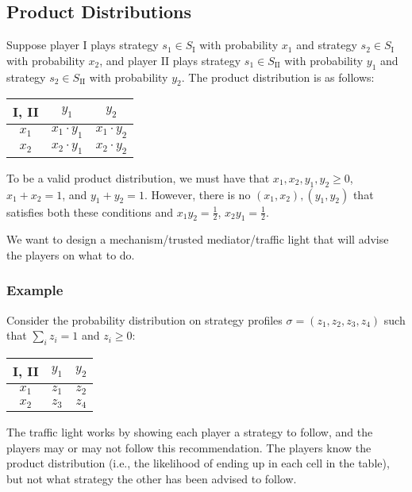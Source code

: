 \subsection{Product Distributions}
	Suppose player I plays strategy $s_1 \in S_\text{I}$ with probability $x_1$
	and strategy $s_2 \in S_\text{I}$ with probability $x_2$, and player II
	plays strategy $s_1 \in S_\text{II}$ with probability $y_1$ and strategy
	$s_2 \in S_\text{II}$ with probability $y_2$. The product distribution is
	as follows:
	\begin{center}
		\begin{tabular}{|c|c|c|}
			\hline
			\textbf{I, II} & $y_1$           & $y_2$ \\ \hline
			$x_1$          & $x_1 \cdot y_1$ & $x_1 \cdot y_2$ \\ \hline
			$x_2$          & $x_2 \cdot y_1$ & $x_2 \cdot y_2$ \\ \hline
		\end{tabular}
	\end{center}

	To be a valid product distribution, we must have that $x_1, x_2, y_1, y_2
	\ge 0$, $x_1 + x_2 = 1$, and $y_1 + y_2 = 1$. However, there is no $(x_1,
	x_2), (y_1, y_2)$ that satisfies both these conditions and $x_1 y_2 =
	\frac{1}{2}$, $x_2 y_1 = \frac{1}{2}$.

	We want to design a mechanism/trusted mediator/traffic light that will
	advise the players on what to do.

	\subsubsection{Example}
		Consider the probability distribution on
		strategy profiles $\sigma = (z_1, z_2, z_3, z_4)$ such that $\sum_i z_i =
		1$ and $z_i \ge 0$:
		\begin{center}
			\begin{tabular}{|c|c|c|}
				\hline
				\textbf{I, II} & $y_1$ & $y_2$ \\ \hline
				$x_1$          & $z_1$ & $z_2$ \\ \hline
				$x_2$          & $z_3$ & $z_4$ \\ \hline
			\end{tabular}
		\end{center}
	
		The traffic light works by showing each player a strategy to follow,
		and the players may or may not follow this recommendation. The players
		know the product distribution (i.e., the likelihood of ending up in
		each cell in the table), but not what strategy the other has been
		advised to follow.

